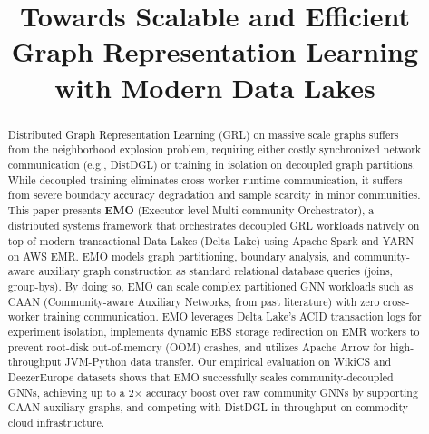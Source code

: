 \documentclass[conference,compsoc]{IEEEtran}
\begin{document}
%
\title{Towards Scalable and Efficient Graph Representation Learning with Modern Data Lakes}

\author{
}

\maketitle

\begin{abstract}
Distributed Graph Representation Learning (GRL) on massive scale graphs suffers from the neighborhood explosion problem, requiring either costly synchronized network communication (e.g., DistDGL) or training in isolation on decoupled graph partitions. While decoupled training eliminates cross-worker runtime communication, it suffers from severe boundary accuracy degradation and sample scarcity in minor communities. This paper presents \textbf{EMO} (Executor-level Multi-community Orchestrator), a distributed systems framework that orchestrates decoupled GRL workloads natively on top of modern transactional Data Lakes (Delta Lake) using Apache Spark and YARN on AWS EMR. EMO models graph partitioning, boundary analysis, and community-aware auxiliary graph construction as standard relational database queries (joins, group-bys). By doing so, EMO can scale complex partitioned GNN workloads such as CAAN (Community-aware Auxiliary Networks, from past literature) with zero cross-worker training communication. EMO leverages Delta Lake's ACID transaction logs for experiment isolation, implements dynamic EBS storage redirection on EMR workers to prevent root-disk out-of-memory (OOM) crashes, and utilizes Apache Arrow for high-throughput JVM-Python data transfer. Our empirical evaluation on WikiCS and DeezerEurope datasets shows that EMO successfully scales community-decoupled GNNs, achieving up to a 2$\times$ accuracy boost over raw community GNNs by supporting CAAN auxiliary graphs, and competing with DistDGL in throughput on commodity cloud infrastructure.
\end{abstract}
\end{document}
